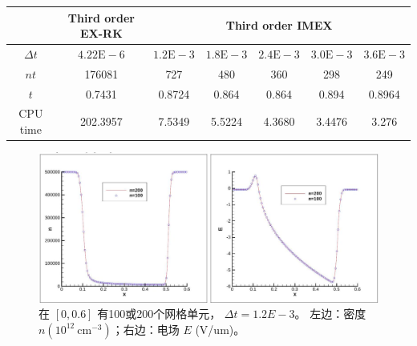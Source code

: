 \begin{center}
    \begin{tabular}{|c|c|c|c|c|c|c|}
        \hline
                   & Third order EX-RK   & \multicolumn{5}{|c|}{Third order IMEX}                                                                                     \\
        \hline
        $\Delta t$ & $4.22 \mathrm{E}-6$ & $1.2 \mathrm{E}-3$                     & $1.8 \mathrm{E}-3$ & $2.4 \mathrm{E}-3$ & $3.0 \mathrm{E}-3$ & $3.6 \mathrm{E}-3$ \\
        \hline
        $n t$      & 176081              & 727                                    & 480                & 360                & 298                & 249                \\
        \hline
        $t$        & 0.7431              & 0.8724                                 & 0.864              & 0.864              & 0.894              & 0.8964             \\
        \hline
        CPU time   & 202.3957            & 7.5349                                 & 5.5224             & 4.3680             & 3.4476             & 3.276              \\
        \hline
    \end{tabular}
\end{center}
\begin{figure}
    \centering
    \includegraphics[width=\textwidth]{figure/numbericalsimulationresulttranslation}
    \caption{在 $[0,0.6]$ 有100或200个网格单元， $\Delta t=1.2 E-3$。 左边：密度 $n\left(10^{12} \mathrm{~cm}^{-3}\right)$；右边：电场 $E$ (V/um)。}
    \label{fig:numbericalsimulationresulttranslation}
\end{figure}
\begingroup
{}
\printbibliography[title={外文翻译参考文献}]
\endgroup
